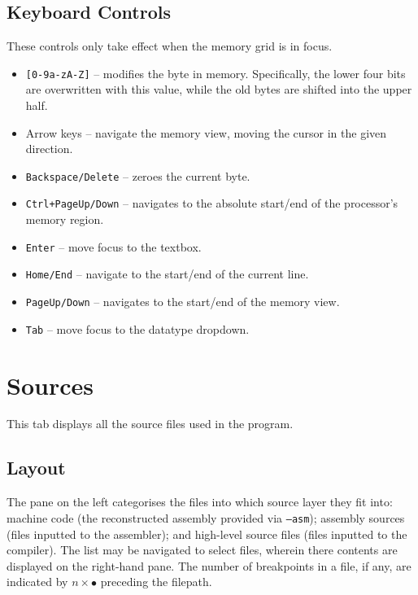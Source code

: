 \documentclass[10pt]{article}
\begin{document}
    \subsection{Keyboard Controls}

    These controls only take effect when the memory grid is in focus.

    \begin{itemize}
        \item \texttt{[0-9a-zA-Z]} -- modifies the byte in memory.
        Specifically, the lower four bits are overwritten with this value, while the old bytes are shifted into the upper half.
        \item Arrow keys -- navigate the memory view, moving the cursor in the given direction.
        \item \texttt{Backspace/Delete} -- zeroes the current byte.
        \item \texttt{Ctrl+PageUp/Down} -- navigates to the absolute start/end of the processor's memory region.
        \item \texttt{Enter} -- move focus to the textbox.
        \item \texttt{Home/End} -- navigate to the start/end of the current line.
        \item \texttt{PageUp/Down} -- navigates to the start/end of the memory view.
        \item \texttt{Tab} -- move focus to the datatype dropdown.
    \end{itemize}

    \section{Sources}

    This tab displays all the source files used in the program.

    \subsection{Layout}

    The pane on the left categorises the files into which source layer they fit into:
    machine code (the reconstructed assembly provided via \texttt{--asm});
    assembly sources (files inputted to the assembler);
    and high-level source files (files inputted to the compiler).
    The list may be navigated to select files, wherein there contents are displayed on the right-hand pane.
    The number of breakpoints in a file, if any, are indicated by \(n \times\){\color{red}\(\bullet\)} preceding the filepath.
\end{document}
